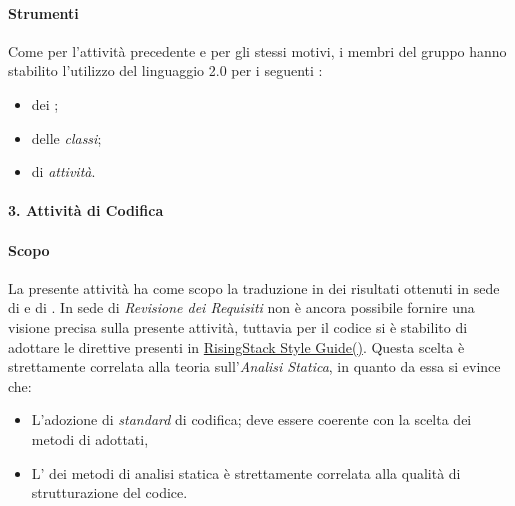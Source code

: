 		 
		        \paragraph*{Strumenti}
		        Come per l'attivit\`a precedente e per gli stessi motivi, i membri del gruppo hanno stabilito l'utilizzo del linguaggio  2.0 per i seguenti
		        :
		        \begin{itemize}
			\item {} dei ; 
			\item {} delle \textit{classi};	
			\item {} di \textit{attivit\`a}.
		        \end{itemize}
			 
		
		\paragraph*{3. Attività di Codifica}
                \paragraph*{Scopo}
                La presente attivit\`a ha come scopo la traduzione in  dei risultati ottenuti in sede
                di  e di .
                In sede di \textit{Revisione dei Requisiti} non \`e ancora possibile fornire una visione precisa sulla presente attivit\`a,
                tuttavia per il codice  
                si \`e stabilito di adottare le direttive presenti in \href{https://github.com/RisingStack/node-style-guide/blob/master/README.md}{RisingStack  Style Guide()}.
                Questa scelta \`e strettamente correlata alla teoria sull'\textit{Analisi Statica}, in quanto da essa si evince che:
                \begin{itemize}
		  \item L’adozione di \textit{standard} di codifica;
                    deve essere coerente con la scelta dei metodi di  adottati,         
		  \item L’ dei metodi di analisi statica \`e strettamente correlata alla qualit\`a di strutturazione del codice.
                \end{itemize}

